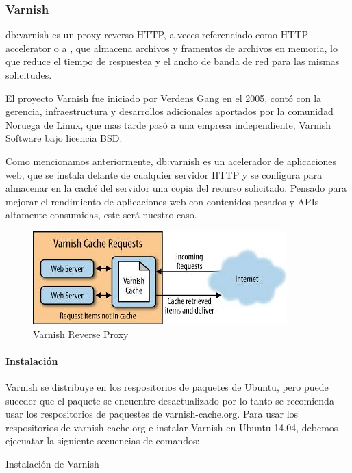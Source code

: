 \subsubsection{Varnish}
\label{soa:tecnologias:varnish}

\gls{db:varnish} es un proxy reverso HTTP, a veces referenciado como HTTP accelerator o a , que almacena archivos y framentos de archivos en memoria, lo que reduce el tiempo de respuestea y el ancho de banda de red para las mismas solicitudes.\cite[p.~20]{varnish2016}

El proyecto Varnish fue iniciado por Verdens Gang en el 2005, contó con la gerencia, infraestructura y desarrollos adicionales aportados por la comunidad Noruega de Linux, que mas tarde pasó a una empresa independiente, Varnish Software bajo licencia BSD.

Como mencionamos anteriormente, \gls{db:varnish} es un acelerador de aplicaciones web, que se instala delante de cualquier servidor HTTP y se configura para almacenar en la caché del servidor una copia del recurso solicitado. Pensado para mejorar el rendimiento de aplicaciones web con contenidos pesados y APIs altamente consumidas, este será nuestro caso.

\begin{figure}[H]
  \includegraphics[width=\linewidth]{src/images/03-capitulo-3/tecnologias/varnish/reverse-proxy.jpg}
  \caption{Varnish Reverse Proxy}
  \label{fig:varnish}
\end{figure}

\paragraph{Instalación}

Varnish se distribuye en los respositorios de paquetes de Ubuntu, pero puede suceder que el paquete se encuentre desactualizado por lo tanto se recomienda usar los respositorios de paquestes de varnish-cache.org.
Para usar los respositorios de varnish-cache.org e instalar Varnish en Ubuntu 14.04, debemos ejecuatar la siguiente secuencias de comandos:

\begin{listing}[H]
  \caption{Instalación de Varnish}
  \label{soa:tecnologias:varnish-cache:bash-preparacion}
\end{listing}
